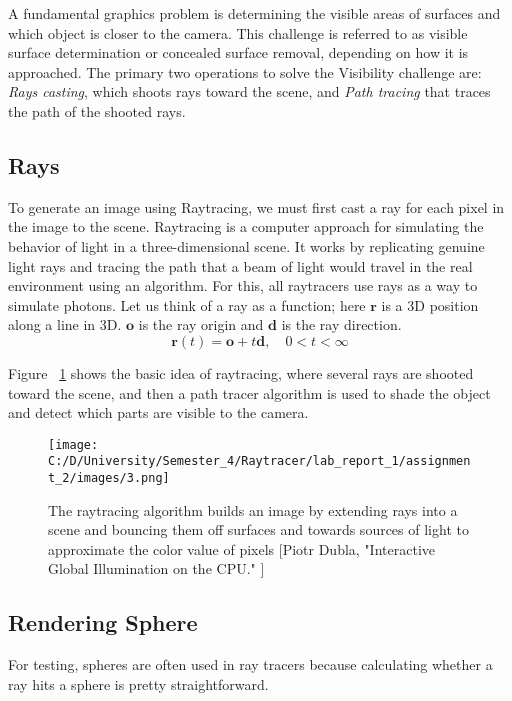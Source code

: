 \documentclass{article}
\begin{document}
	A fundamental graphics problem is determining the visible areas of surfaces and which object is closer to the camera. This challenge is referred to as visible surface determination or concealed surface removal, depending on how it is approached. The primary two operations to solve the Visibility challenge are: \textit{Rays casting}, which shoots rays toward the scene, and \textit{Path tracing} that traces the path of the shooted rays.
	
	\subsection{Rays}
	To generate an image using Raytracing, we must first cast a ray for each pixel in the image to the scene.
	Raytracing is a computer approach for simulating the behavior of light in a three-dimensional scene. It works by replicating genuine light rays and tracing the path that a beam of light would travel in the real environment using an algorithm. 
	For this, all raytracers use rays as a way to simulate photons. Let us think of a ray as a function; here $\pmb{r} $ is a 3D position along a line in 3D. $\pmb{o} $ is the ray origin and $\pmb{d} $ is the ray direction.
	\begin{equation}
		\pmb{r} (t) = \pmb{o} + t\pmb{d} ,  \quad  0 < t < \infty
	\end{equation}
	
	Figure ~\ref{fig:1} shows the basic idea of raytracing, where several rays are shooted toward the scene, and then a path tracer algorithm is used to shade the object and detect which parts are visible to the camera.
	\begin{figure}[H]
		\begin{center}
			\texttt{[image: C:/D/University/Semester\_4/Raytracer/lab\_report\_1/assignment\_2/images/3.png]}
			
			\caption{The raytracing algorithm builds an image by extending rays into a scene and bouncing them off surfaces and towards sources of light to approximate the color value of pixels [Piotr Dubla, "Interactive Global Illumination on the CPU."
				]}
			\label{fig:1}
		\end{center}
	\end{figure}
	
	\subsection{Rendering Sphere}
	For testing, spheres are often used in ray tracers because
	calculating whether a ray hits a sphere is pretty straightforward.
	
\end{document}
